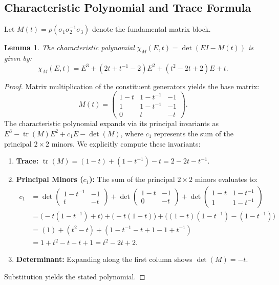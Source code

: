 \documentclass[11pt]{article}
\newtheorem{lemma}[theorem]{Lemma}
\begin{document}
\subsection{Characteristic Polynomial and Trace Formula}

Let $M(t) = \rho(\sigma_1\sigma_2^{-1}\sigma_3)$ denote the fundamental matrix block. 

\begin{lemma}\label{lem:char_poly}
The characteristic polynomial $\chi_M(E,t) = \det(EI - M(t))$ is given by:
\begin{equation}
\chi_M(E,t) = E^3 + (2t + t^{-1} - 2)E^2 + (t^2 - 2t + 2)E + t.
\end{equation}
\end{lemma}

\begin{proof}
Matrix multiplication of the constituent generators yields the base matrix:
\begin{equation*}
M(t) = \begin{pmatrix} 1-t & 1-t^{-1} & -1 \\ 1 & 1-t^{-1} & -1 \\ 0 & t & -t \end{pmatrix}.
\end{equation*}
The characteristic polynomial expands via its principal invariants as $E^3 - \operatorname{tr}(M)E^2 + c_1 E - \det(M)$, where $c_1$ represents the sum of the principal $2 \times 2$ minors. We explicitly compute these invariants:
\begin{enumerate}
    \item \textbf{Trace:} $\operatorname{tr}(M) = (1-t) + (1-t^{-1}) - t = 2 - 2t - t^{-1}$.
    \item \textbf{Principal Minors ($c_1$):} The sum of the principal $2 \times 2$ minors evaluates to:
    \begin{align*}
    c_1 &= \det\begin{pmatrix} 1-t^{-1} & -1 \\ t & -t \end{pmatrix} + \det\begin{pmatrix} 1-t & -1 \\ 0 & -t \end{pmatrix} + \det\begin{pmatrix} 1-t & 1-t^{-1} \\ 1 & 1-t^{-1} \end{pmatrix} \\
    &= \big( -t(1-t^{-1}) + t \big) + \big( -t(1-t) \big) + \big( (1-t)(1-t^{-1}) - (1-t^{-1}) \big) \\
    &= (1) + (t^2-t) + (1 - t^{-1} - t + 1 - 1 + t^{-1}) \\
    &= 1 + t^2 - t - t + 1 = t^2 - 2t + 2.
    \end{align*}
    \item \textbf{Determinant:} Expanding along the first column shows $\det(M) = -t$.
\end{enumerate}
Substitution yields the stated polynomial.
\end{proof}
\end{document}
